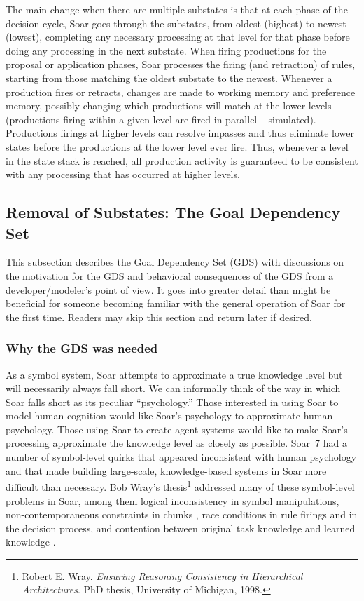 The main change when there are multiple substates is that at each phase of the decision cycle, Soar goes through the substates, from oldest (highest) to newest (lowest), completing any necessary processing at that level for that phase before doing any processing in the next substate.  When firing productions for the proposal or application phases, Soar processes the firing (and retraction) of rules, starting from those matching the oldest substate to the newest.  Whenever a production fires or retracts, changes are made to working memory and preference memory, possibly changing which productions will match at the lower levels (productions firing within a given level are fired in parallel -- simulated). Productions firings at higher levels can resolve impasses and thus eliminate lower states before the productions at the lower level ever fire.  Thus, whenever a level in the state stack is reached, all production activity is guaranteed to be consistent with any processing that has occurred at higher levels.

\subsection{Removal of Substates: The Goal Dependency Set}
This subsection describes the Goal Dependency Set (GDS) with discussions on the motivation for the GDS and behavioral consequences of the GDS from a developer/modeler's point of view. It goes into greater detail than might be beneficial for someone becoming familiar with the general operation of Soar for the first time. Readers may skip this section and return later if desired.

\subsubsection{Why the GDS was needed}

As a symbol system, Soar attempts to approximate a true knowledge level but will necessarily always fall short\cite{Newell90:UTC}.  We can informally think of the way in which Soar falls short as its peculiar ``psychology.''  Those interested in using Soar to model human cognition would like Soar's psychology to approximate human psychology. Those using Soar to create agent systems would like to make Soar's processing approximate the knowledge level as closely as possible. Soar~7 had a number of symbol-level quirks that appeared inconsistent with human psychology and that made building large-scale, knowledge-based systems in Soar more difficult than necessary. Bob Wray's thesis\footnote{
	Robert E. Wray. \textit{Ensuring Reasoning Consistency in Hierarchical Architectures}. PhD thesis, University of Michigan, 1998.} 
addressed many of these symbol-level problems in Soar, among them logical inconsistency in symbol manipulations, non-contemporaneous constraints in chunks \cite{Wray96:Compilation}, race conditions in rule firings and in the decision process, and contention between original task knowledge and learned knowledge \cite{Wray01:Resolving}.

